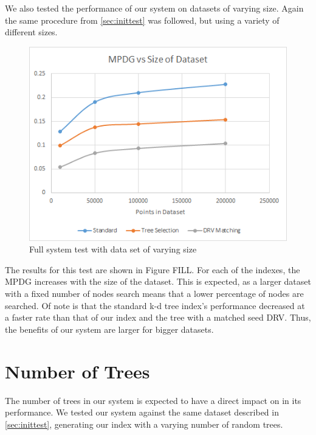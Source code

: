 We also tested the performance of our system on datasets of varying size.  Again the same procedure from \ref{sec:inittest} was followed, but using a variety of different sizes.

\begin{figure}[h]
\begin{center}
\includegraphics[width=.85\textwidth]{Figures/size}
\end{center}
\caption{Full system test with data set of varying size}
\label{fig:size}
\end{figure}

The results for this test are shown in Figure FILL.  For each of the indexes, the MPDG increases with the size of the dataset.  This is expected, as a larger dataset with a fixed number of nodes search means that a lower percentage of nodes are searched.  Of note is that the standard k-d tree index's performance decreased at a faster rate than that of our index and the tree with a matched seed DRV.  Thus, the benefits of our system are larger for bigger datasets. 

\section{Number of Trees}

The number of trees in our system is expected to have a direct impact on in its performance.  We tested our system against the same dataset described in \ref{sec:inittest}, generating our index with a varying number of random trees.


